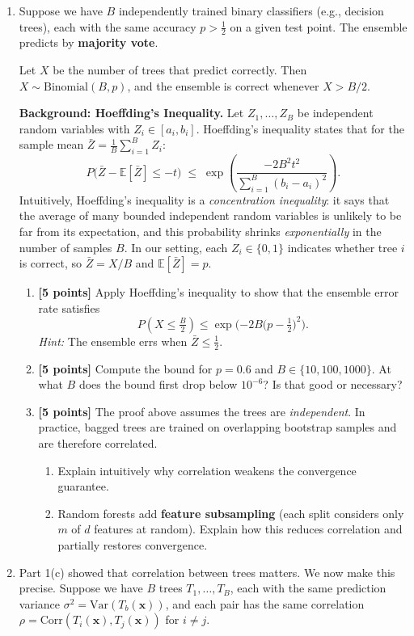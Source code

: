 \documentclass[submit]{harvardml}
\begin{document}
\begin{problem}

\noindent
\begin{enumerate}
	\item Suppose we have $B$ independently trained binary classifiers (e.g., decision trees), each with the same accuracy $p > \tfrac{1}{2}$ on a given test point. The ensemble predicts by \textbf{majority vote}.

Let $X$ be the number of trees that predict correctly. Then $X \sim \text{Binomial}(B, p)$, and the ensemble is correct whenever $X > B/2$.

\medskip
\noindent
\textbf{Background: Hoeffding's Inequality.}\quad
Let $Z_1, \ldots, Z_B$ be independent random variables with $Z_i \in [a_i, b_i]$. Hoeffding's inequality states that for the sample mean $\bar{Z} = \frac{1}{B}\sum_{i=1}^{B} Z_i$:
\[
P\!\big(\bar{Z} - \mathbb{E}[\bar{Z}] \leq -t\big) \;\leq\; \exp\!\!\left(\frac{-2B^2 t^2}{\sum_{i=1}^{B}(b_i - a_i)^2}\right).
\]
Intuitively, Hoeffding's inequality is a \emph{concentration inequality}: it says that the average of many bounded independent random variables is unlikely to be far from its expectation, and this probability shrinks \emph{exponentially} in the number of samples $B$. In our setting, each $Z_i \in \{0, 1\}$ indicates whether tree $i$ is correct, so $\bar{Z} = X/B$ and $\mathbb{E}[\bar{Z}] = p$.

\begin{enumerate}
    \item \textbf{[5 points]} Apply Hoeffding's inequality to show that the ensemble error rate satisfies
    \[
    P(X \leq \tfrac{B}{2}) \leq \exp\!\Big({-2B\big(p - \tfrac{1}{2}\big)^2}\Big).
    \]
    \emph{Hint:} The ensemble errs when $\bar{Z} \leq \tfrac{1}{2}$. 

    \item \textbf{[5 points]} Compute the bound for $p = 0.6$ and $B \in \{10, 100, 1000\}$. At what $B$ does the bound first drop below $10^{-6}$? Is that good or necessary?

    \item \textbf{[5 points]} The proof above assumes the trees are \emph{independent}. In practice, bagged trees are trained on overlapping bootstrap samples and are therefore correlated.
    \begin{enumerate}
        \item Explain intuitively why correlation weakens the convergence guarantee.
        \item Random forests add \textbf{feature subsampling} (each split considers only $m$ of $d$ features at random). Explain how this reduces correlation and partially restores convergence.
    \end{enumerate}
\end{enumerate}
\item
Part 1(c) showed that correlation between trees matters. We now make this precise. Suppose we have $B$ trees $T_1, \ldots, T_B$, each with the same prediction variance $\sigma^2 = \text{Var}(T_b(\mathbf{x}))$, and each pair has the same correlation $\rho = \text{Corr}(T_i(\mathbf{x}), T_j(\mathbf{x}))$ for $i \neq j$.


\end{enumerate}
\end{problem}
\end{document}
